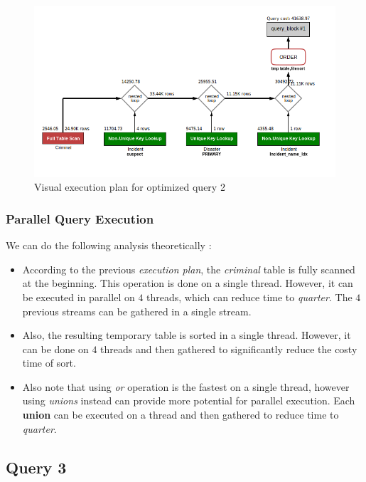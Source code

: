 \begin{figure}[H]
    \centering
    \includegraphics[width=\textwidth]{images/execution_plans/q2-4-new.png}
    \caption{Visual execution plan for optimized query 2}
\end{figure}

\subsubsection{Parallel Query Execution}
We can do the following analysis theoretically :
\begin{itemize}
    \item According to the previous \emph{execution plan}, the \emph{criminal} table is fully scanned at the beginning. This operation is done on a single thread. However, it can be executed in parallel on $4$ threads, which can reduce time to \emph{quarter}. The $4$ previous streams can be gathered in a single stream.
    \item Also, the resulting temporary table is sorted in a single thread. However, it can be done on $4$ threads and then gathered to significantly reduce the costy time of sort.
    \item Also note that using \emph{or} operation is the fastest on a single thread, however using 
    \emph{unions} instead can provide more potential for parallel execution. Each \textbf{union} can be executed on a thread and then gathered to reduce time to \emph{quarter}.
\end{itemize}

\subsection{Query 3}

